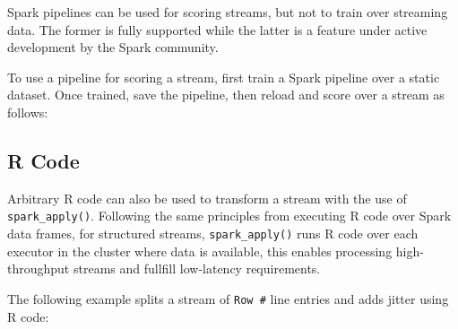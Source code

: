 \documentclass[]{book}
\newenvironment{Shaded}{\begin{snugshade}}{\end{snugshade}}
\newcommand{\ControlFlowTok}[1]{\textcolor[rgb]{0.13,0.29,0.53}{\textbf{#1}}}
\newcommand{\DataTypeTok}[1]{\textcolor[rgb]{0.13,0.29,0.53}{#1}}
\newcommand{\KeywordTok}[1]{\textcolor[rgb]{0.13,0.29,0.53}{\textbf{#1}}}
\newcommand{\NormalTok}[1]{#1}
\newcommand{\OperatorTok}[1]{\textcolor[rgb]{0.81,0.36,0.00}{\textbf{#1}}}
\newcommand{\StringTok}[1]{\textcolor[rgb]{0.31,0.60,0.02}{#1}}
\theoremstyle{definition}
\theoremstyle{definition}
\theoremstyle{definition}
\theoremstyle{remark}
\begin{document}
Spark pipelines can be used for scoring streams, but not to train over
streaming data. The former is fully supported while the latter is a
feature under active development by the Spark community.

To use a pipeline for scoring a stream, first train a Spark pipeline
over a static dataset. Once trained, save the pipeline, then reload and
score over a stream as follows:

\begin{Shaded}
\end{Shaded}

\hypertarget{streams-r}{%
\subsection{R Code}\label{streams-r}}

Arbitrary R code can also be used to transform a stream with the use of
\texttt{spark\_apply()}. Following the same principles from executing R
code over Spark data frames, for structured streams,
\texttt{spark\_apply()} runs R code over each executor in the cluster
where data is available, this enables processing high-throughput streams
and fullfill low-latency requirements.

The following example splits a stream of \texttt{Row\ \#} line entries
and adds jitter using R code:

\begin{Shaded}
\end{Shaded}
\end{document}
